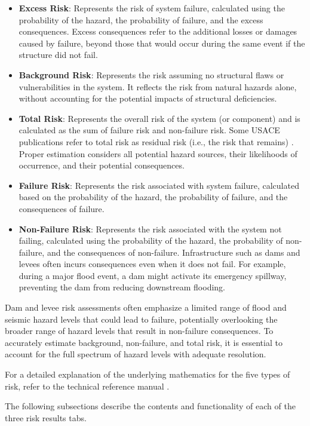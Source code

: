\documentclass[
]{book}
\begin{document}
\begin{itemize}
\item
  \textbf{Excess Risk}: Represents the risk of system failure, calculated using the probability of the hazard, the probability of failure, and the excess consequences. Excess consequences refer to the additional losses or damages caused by failure, beyond those that would occur during the same event if the structure did not fail.
\item
  \textbf{Background Risk}: Represents the risk assuming no structural flaws or vulnerabilities in the system. It reflects the risk from natural hazards alone, without accounting for the potential impacts of structural deficiencies.
\item
  \textbf{Total Risk}: Represents the overall risk of the system (or component) and is calculated as the sum of failure risk and non-failure risk. Some USACE publications refer to total risk as residual risk (i.e., the risk that remains) \citep{cite-EM1619} \citep{cite-ER1156}. Proper estimation considers all potential hazard sources, their likelihoods of occurrence, and their potential consequences.
\item
  \textbf{Failure Risk}: Represents the risk associated with system failure, calculated based on the probability of the hazard, the probability of failure, and the consequences of failure.
\item
  \textbf{Non-Failure Risk}: Represents the risk associated with the system not failing, calculated using the probability of the hazard, the probability of non-failure, and the consequences of non-failure. Infrastructure such as dams and levees often incurs consequences even when it does not fail. For example, during a major flood event, a dam might activate its emergency spillway, preventing the dam from reducing downstream flooding.
\end{itemize}

Dam and levee risk assessments often emphasize a limited range of flood and seismic hazard levels that could lead to failure, potentially overlooking the broader range of hazard levels that result in non-failure consequences. To accurately estimate background, non-failure, and total risk, it is essential to account for the full spectrum of hazard levels with adequate resolution.

For a detailed explanation of the underlying mathematics for the five types of risk, refer to the technical reference manual \citep{cite-TechRef}.

The following subsections describe the contents and functionality of each of the three risk results tabs.
\end{document}
